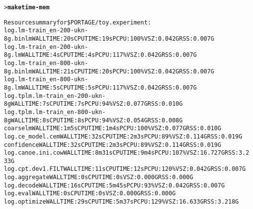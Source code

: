 \documentclass[11pt,letterpaper]{article}
\begin{document}
\begin{small}
\begin{alltt}
> \textbf{make time-mem}
\end{alltt}
\end{small}
\vspace{-2em}
\begin{tiny}
\begin{alltt}
Resource summary for \$PORTAGE/toy.experiment:
         log.lm-train_en-200-ukn-8g.binlm                 WALL TIME: 20s      CPU TIME: 19s       PCPU: 100\%   VSZ: 0.042G    RSS: 0.007G
         log.lm-train_en-200-ukn-8g.lm                    WALL TIME: 4s       CPU TIME: 4s        PCPU: 117\%   VSZ: 0.042G    RSS: 0.007G
         log.lm-train_en-800-ukn-8g.binlm                 WALL TIME: 21s      CPU TIME: 20s       PCPU: 100\%   VSZ: 0.042G    RSS: 0.007G
         log.lm-train_en-800-ukn-8g.lm                    WALL TIME: 5s       CPU TIME: 5s        PCPU: 117\%   VSZ: 0.042G    RSS: 0.007G
         log.tplm.lm-train_en-200-ukn-8g                  WALL TIME: 7s       CPU TIME: 7s        PCPU: 94\%    VSZ: 0.077G    RSS: 0.010G
         log.tplm.lm-train_en-800-ukn-8g                  WALL TIME: 8s       CPU TIME: 8s        PCPU: 94\%    VSZ: 0.054G    RSS: 0.008G
      coarselm                                            WALL TIME: 1m5s     CPU TIME: 1m4s      PCPU: 100\%   VSZ: 0.077G    RSS: 0.010G
         log.ce_model.cem                                 WALL TIME: 32s      CPU TIME: 2m3s      PCPU: 89\%    VSZ: 0.114G    RSS: 0.019G
      confidence                                          WALL TIME: 32s      CPU TIME: 2m3s      PCPU: 89\%    VSZ: 0.114G    RSS: 0.019G
         log.canoe.ini.cow                                WALL TIME: 8m31s    CPU TIME: 9m4s      PCPU: 107\%   VSZ: 16.727G   RSS: 3.233G
         log.cpt.dev1.FILT                                WALL TIME: 11s      CPU TIME: 12s       PCPU: 120\%   VSZ: 0.042G    RSS: 0.007G
            log.aggregate                                 WALL TIME: 0s       CPU TIME: 0s                     VSZ: 0.000G    RSS: 0.000G
            log.decode                                    WALL TIME: 16s      CPU TIME: 5m45s     PCPU: 93\%    VSZ: 0.042G    RSS: 0.007G
            log.eval                                      WALL TIME: 0s       CPU TIME: 0s                     VSZ: 0.000G    RSS: 0.000G
            log.optimize                                  WALL TIME: 29s      CPU TIME: 5m37s     PCPU: 129\%   VSZ: 16.633G   RSS: 3.218G

\end{alltt}
\end{tiny}
\end{document}
